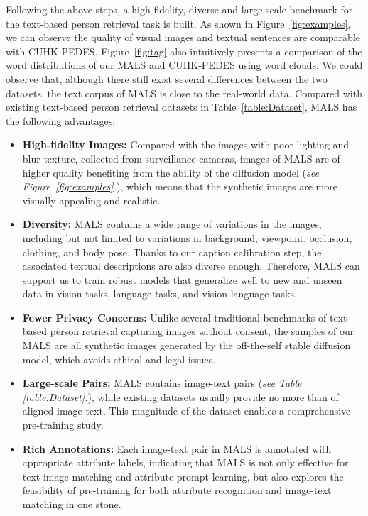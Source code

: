 \documentclass[sigconf]{acmart}
\begin{document}
Following the above steps, a high-fidelity, diverse and large-scale benchmark for the text-based person retrieval task is built. 
As shown in Figure~\ref{fig:examples}, we can observe the quality of visual images and textual sentences are comparable with CUHK-PEDES.
Figure~\ref{fig:tag} also intuitively presents a comparison of the word distributions of our MALS and CUHK-PEDES using word clouds. We could observe that, although there still exist several differences between the two datasets, the text corpus of MALS is close to the real-world data.
Compared with existing text-based person retrieval datasets in Table~\ref{table:Dataset}, MALS has the following advantages:


\begin{itemize}[leftmargin=*]
\item \textbf{High-fidelity Images:} Compared with the images with poor lighting and blur texture, collected from surveillance cameras, images of MALS are of higher quality benefiting from the ability of the diffusion model (\emph{see Figure~\ref{fig:examples}.}), which means that the synthetic images are more visually appealing and realistic.

\item \textbf{Diversity:} MALS contains a wide range of variations in the images, including but not limited to variations in background, viewpoint, occlusion, clothing, and body pose. Thanks to our caption calibration step, the associated textual descriptions are also diverse enough. Therefore, MALS can support us to train robust models that generalize well to new and unseen data in vision tasks, language tasks, and vision-language tasks.

\item \textbf{Fewer Privacy Concerns:} Unlike several traditional benchmarks of text-based person retrieval capturing images without consent, the samples of our MALS are all synthetic images generated by the off-the-self stable diffusion model, which avoids ethical and legal issues.

\item \textbf{Large-scale Pairs:} MALS contains  image-text pairs (\emph{see Table \ref{table:Dataset}.}), while existing datasets usually provide no more than  of aligned image-text. This magnitude of the dataset enables a comprehensive pre-training study.

\item \textbf{Rich Annotations:} Each image-text pair in MALS is annotated with appropriate attribute labels, indicating that MALS is not only effective for text-image matching and attribute prompt learning, but also explores the feasibility of pre-training for both attribute recognition and image-text matching in one stone.
\end{itemize}
\end{document}
